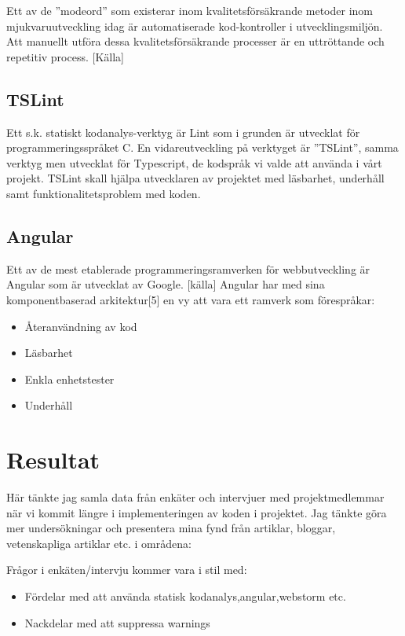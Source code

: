 Ett av de ”modeord” som existerar inom kvalitetsförsäkrande metoder inom mjukvaruutveckling idag är automatiserade kod-kontroller i utvecklingsmiljön. Att manuellt utföra dessa kvalitetsförsäkrande processer är en uttröttande och repetitiv process. [Källa]

\subsection{TSLint}
Ett s.k. statiskt kodanalys-verktyg är Lint som i grunden är utvecklat för programmeringsspråket C. En vidareutveckling på verktyget är ”TSLint”, samma verktyg men utvecklat för Typescript, de kodspråk vi valde att använda i vårt projekt. TSLint skall hjälpa utvecklaren av projektet med läsbarhet, underhåll samt funktionalitetsproblem med koden.

\subsection{Angular}
Ett av de mest etablerade programmeringsramverken för webbutveckling är Angular som är utvecklat av Google. [källa] Angular har med sina komponentbaserad arkitektur[5] en vy att vara ett ramverk som förespråkar:

\begin{itemize}
	\item Återanvändning av kod
	\item Läsbarhet
	\item Enkla enhetstester
	\item Underhåll
\end{itemize}


\section{Resultat}
Här tänkte jag samla data från enkäter och intervjuer med projektmedlemmar när vi kommit längre i implementeringen av koden i projektet.
Jag tänkte göra mer undersökningar och presentera mina fynd från artiklar, bloggar, vetenskapliga artiklar etc. i områdena: 

Frågor i enkäten/intervju kommer vara i stil med:


\begin{itemize}
	\item Fördelar med att använda statisk kodanalys,angular,webstorm etc. 
	\item Nackdelar med att suppressa warnings 
\end{itemize}

